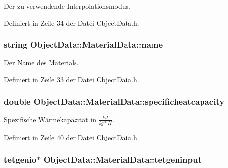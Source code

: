 Der zu verwendende Interpolationsmodus. 



Definiert in Zeile 34 der Datei Object\-Data.\-h.

\hypertarget{structObjectData_1_1MaterialData_a795f1265218b9a125559bbe9231f3c8d}{
\subsubsection[{name}]{\setlength{\rightskip}{0pt plus 5cm}string Object\-Data\-::\-Material\-Data\-::name}}\label{structObjectData_1_1MaterialData_a795f1265218b9a125559bbe9231f3c8d}


Der Name des Materials. 



Definiert in Zeile 33 der Datei Object\-Data.\-h.

\hypertarget{structObjectData_1_1MaterialData_a784e2b70f98d146979fd422d41445fea}{
\subsubsection[{specificheatcapacity}]{\setlength{\rightskip}{0pt plus 5cm}double Object\-Data\-::\-Material\-Data\-::specificheatcapacity}}\label{structObjectData_1_1MaterialData_a784e2b70f98d146979fd422d41445fea}


Spezifische Wärmekapazität in $\frac{kJ}{kg*K}$. 



Definiert in Zeile 40 der Datei Object\-Data.\-h.

\hypertarget{structObjectData_1_1MaterialData_ab752395b4aedbe011fa49de7fbbd36ee}{
\subsubsection[{tetgeninput}]{\setlength{\rightskip}{0pt plus 5cm}tetgenio$\ast$ Object\-Data\-::\-Material\-Data\-::tetgeninput}}\label{structObjectData_1_1MaterialData_ab752395b4aedbe011fa49de7fbbd36ee}


